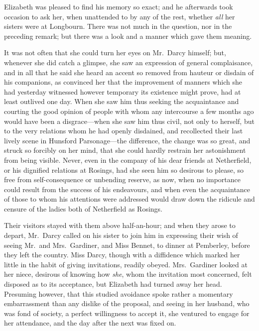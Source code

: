 Elizabeth was pleased to find his memory so exact; and he
afterwards took occasion to ask her, when unattended to by
any of the rest, whether \emph{all} her sisters were at Longbourn.
There was not much in the question, nor in the preceding
remark; but there was a look and a manner which gave them
meaning.

It was not often that she could turn her eyes on Mr.\ Darcy
himself; but, whenever she did catch a glimpse, she saw an
expression of general complaisance, and in all that he said
she heard an accent so removed from hauteur or disdain of his
companions, as convinced her that the improvement of manners
which she had yesterday witnessed however temporary its
existence might prove, had at least outlived one day.  When she
saw him thus seeking the acquaintance and courting the good
opinion of people with whom any intercourse a few months ago
would have been a disgrace---when she saw him thus civil, not
only to herself, but to the very relations whom he had openly
disdained, and recollected their last lively scene in Hunsford
Parsonage---the difference, the change was so great, and struck
so forcibly on her mind, that she could hardly restrain her
astonishment from being visible.  Never, even in the company
of his dear friends at Netherfield, or his dignified relations
at Rosings, had she seen him so desirous to please, so free
from self-consequence or unbending reserve, as now, when no
importance could result from the success of his endeavours, and
when even the acquaintance of those to whom his attentions
were addressed would draw down the ridicule and censure of
the ladies both of Netherfield as Rosings.

Their visitors stayed with them above half-an-hour; and when
they arose to depart, Mr.\ Darcy called on his sister to join him
in expressing their wish of seeing Mr.\ and Mrs.\ Gardiner, and
Miss Bennet, to dinner at Pemberley, before they left the
country.  Miss Darcy, though with a diffidence which marked
her little in the habit of giving invitations, readily obeyed.
Mrs.\ Gardiner looked at her niece, desirous of knowing how \emph{she},
whom the invitation most concerned, felt disposed as to its
acceptance, but Elizabeth had turned away her head.  Presuming
however, that this studied avoidance spoke rather a momentary
embarrassment than any dislike of the proposal, and seeing in
her husband, who was fond of society, a perfect willingness to
accept it, she ventured to engage for her attendance, and the
day after the next was fixed on.

